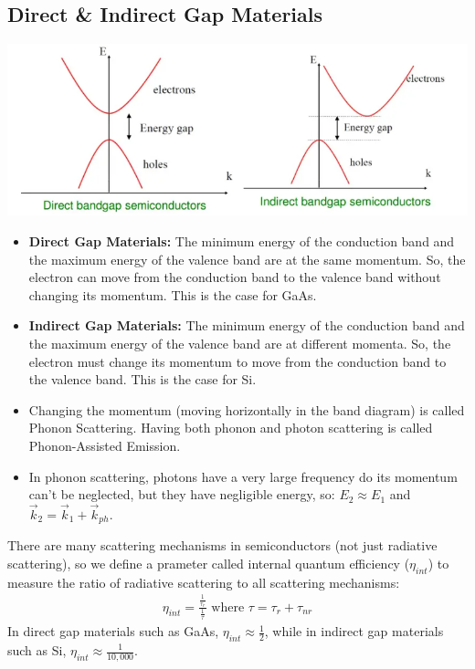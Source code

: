 \documentclass[11pt]{article}
\begin{document}
\subsection{Direct \& Indirect Gap Materials}
\begin{center}
    \includegraphics[scale=0.7]{5.png}
\end{center}
\begin{itemize}
    \item \textbf{Direct Gap Materials:} The minimum energy of the conduction band and the maximum energy of the valence band are at the same momentum. So, the electron can move from the conduction band to the valence band without changing its momentum. This is the case for GaAs.
    \item \textbf{Indirect Gap Materials:} The minimum energy of the conduction band and the maximum energy of the valence band are at different momenta. So, the electron must change its momentum to move from the conduction band to the valence band. This is the case for Si.
    \item Changing the momentum (moving horizontally in the band diagram) is called Phonon Scattering. Having both phonon and photon scattering is called Phonon-Assisted Emission.
    \item In phonon scattering, photons have a very large frequency do its momentum can't be neglected, but they have negligible energy, so: $E_2 \approx E_1$ and $\vec{k}_2 =\vec{k}_1 + \vec{k}_{ph}$.
\end{itemize}
There are many scattering mechanisms in semiconductors (not just radiative scattering), so we define a prameter called internal quantum efficiency ($\eta_{int}$) to measure the ratio of radiative scattering to all scattering mechanisms:
\begin{align*}
    \eta_{int} = \frac{\frac{1}{\tau_r}}{\frac{1}{\tau}} \text{ where } \tau = \tau_r + \tau_{nr}
\end{align*}
In direct gap materials such as GaAs, $\eta_{int} \approx \frac{1}{2}$, while in indirect gap materials such as Si, $\eta_{int} \approx \frac{1}{10,000}$.
\end{document}
